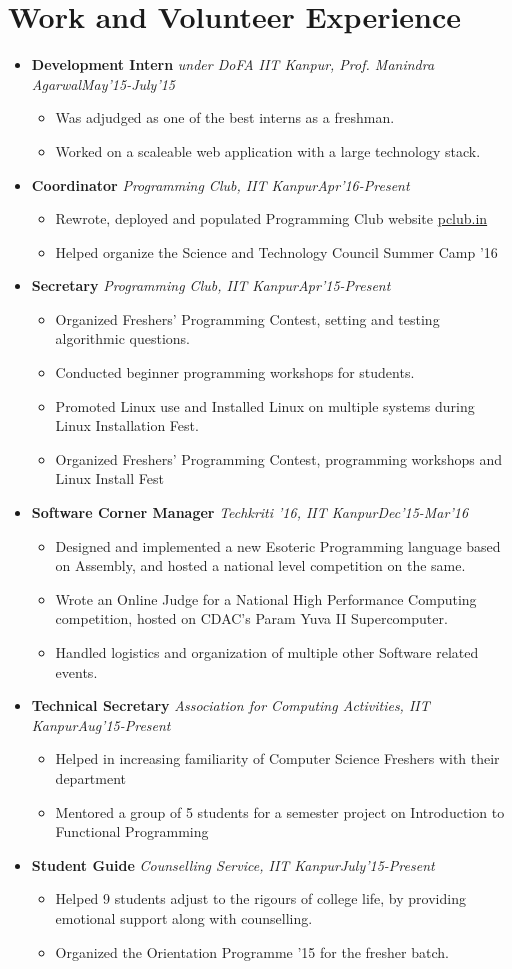 \documentclass[11pt,a4paper]{moderncv}
\newcommand{\experience}[4]{
  \vspace{0.1cm}
\item \textbf{\large{#1}} \textit{#2}\hfill\textit{#3}
  \begin{itemize}[leftmargin=*]
    \setlength\itemsep{0em} #4
  \end{itemize}
}
\begin{document}
\section*{Work and Volunteer Experience}
\begin{itemize}
  \setlength\itemsep{0.5em}
  \experience{Development Intern}{under DoFA IIT Kanpur, Prof. Manindra Agarwal}{May'15-July'15}{
  \item Was adjudged as one of the best interns as a freshman.
  \item Worked on a scaleable web application with a large technology
    stack.
  }

  \experience{Coordinator}{Programming Club, IIT
    Kanpur}{Apr'16-Present}{
  \item Rewrote, deployed and populated Programming Club website \href{https://pclub.in}{pclub.in}
  \item Helped organize the Science and Technology Council Summer Camp
    '16
  }

  \experience{Secretary}{Programming Club, IIT Kanpur}{Apr'15-Present}{
  \item	Organized Freshers’ Programming Contest, setting and testing algorithmic questions.
  \item	Conducted beginner programming workshops for students.
  \item Promoted Linux use and Installed Linux on multiple systems during Linux Installation Fest.
  \item Organized Freshers’ Programming Contest, programming workshops and Linux Install Fest
  }

  \experience{Software Corner Manager}{Techkriti '16, IIT
    Kanpur}{Dec'15-Mar'16}{
  \item	Designed and implemented a new Esoteric Programming language based on Assembly, and hosted a national level competition on the same.
  \item	Wrote an Online Judge for a National High Performance Computing competition, hosted on CDAC’s Param Yuva II Supercomputer.
  \item	Handled logistics and organization of multiple other Software related events.
  }

  \experience{Technical Secretary}{Association for Computing Activities, IIT Kanpur}{Aug'15-Present}{
  \item	Helped in increasing familiarity of Computer Science Freshers with their department
  \item	Mentored a group of 5 students for a semester project on Introduction to Functional Programming
  }

  \experience{Student Guide}{Counselling Service, IIT Kanpur}{July'15-Present}{
  \item Helped 9 students adjust to the rigours of college life, by providing emotional support along with counselling.
  \item Organized the Orientation Programme '15 for the fresher batch.
  }

\end{itemize}
\end{document}
